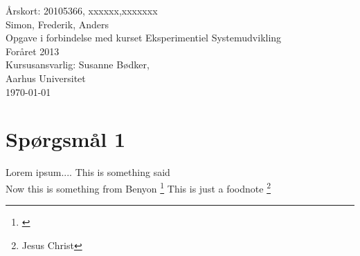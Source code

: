 \documentclass[12pt,a4paper,twoside,danish,article]{memoir}
\begin{document}
\frontmatter
\begin{titlingpage}
  \begin{center}
    \mbox{}\vfill
    \vspace{3cm}
    \Large{Årskort: 20105366, xxxxxx,xxxxxxx}\\
    \Large{Simon, Frederik, Anders}\\
    \vspace{10cm}
    Opgave i forbindelse med kurset Eksperimentiel Systemudvikling\\
    Foråret 2013\\
    \vspace{1cm}
    Kursusansvarlig: Susanne Bødker,\\Aarhus Universitet\\
    \today
  \end{center}
  \clearpage
  \tableofcontents*
\end{titlingpage}

\mainmatter

\renewcommand{\baselinestretch}{1.6}\normalsize %

\renewcommand{\chaptermark}[1]{\markboth{\thechapter.
    #1}{\thechapter. #1}} %
\renewcommand{\bibmark}{\markboth{\bibname}{\bibname}} %
\renewcommand{\tocmark}{\markboth{\contentsname}{\contentsname}}


\chapter{Spørgsmål 1}
Lorem ipsum....
This is something  \cite{Stolerman} said\\
Now this is something from Benyon \footnote{\citep[s.90]{Benyon}}
This is just a foodnote \footnote{Jesus Christ}
\end{document}
